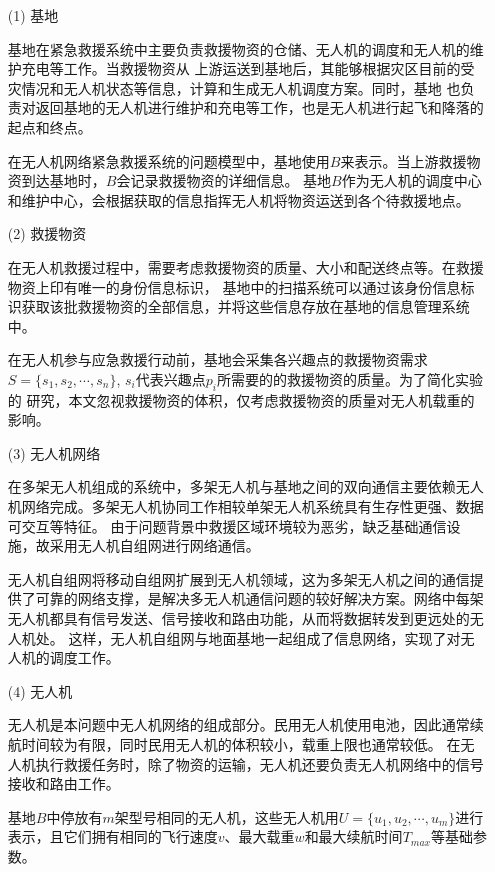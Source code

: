 \begin{itemize}
	\item [(1)]  
	基地


	\qquad 基地在紧急救援系统中主要负责救援物资的仓储、无人机的调度和无人机的维护充电等工作。当救援物资从
	上游运送到基地后，其能够根据灾区目前的受灾情况和无人机状态等信息，计算和生成无人机调度方案。同时，基地
	也负责对返回基地的无人机进行维护和充电等工作，也是无人机进行起飞和降落的起点和终点。


	\qquad 在无人机网络紧急救援系统的问题模型中，基地使用$B$来表示。当上游救援物资到达基地时，$B$会记录救援物资的详细信息。
	基地$B$作为无人机的调度中心和维护中心，会根据获取的信息指挥无人机将物资运送到各个待救援地点。

	\item[(2)]
	救援物资

	
	\qquad 在无人机救援过程中，需要考虑救援物资的质量、大小和配送终点等。在救援物资上印有唯一的身份信息标识，
	基地中的扫描系统可以通过该身份信息标识获取该批救援物资的全部信息，并将这些信息存放在基地的信息管理系统中。


	\qquad 在无人机参与应急救援行动前，基地会采集各兴趣点的救援物资需求$S=\lbrace s_1, s_2, \cdots ,s_n \rbrace$, $s_i$代表兴趣点$p_i$所需要的的救援物资的质量。为了简化实验的
	研究，本文忽视救援物资的体积，仅考虑救援物资的质量对无人机载重的影响。

	\item[(3)]
	无人机网络

	\qquad 在多架无人机组成的系统中，多架无人机与基地之间的双向通信主要依赖无人机网络完成。多架无人机协同工作相较单架无人机系统具有生存性更强、数据可交互等特征。
	由于问题背景中救援区域环境较为恶劣，缺乏基础通信设施，故采用无人机自组网进行网络通信。


	\qquad 无人机自组网将移动自组网扩展到无人机领域，这为多架无人机之间的通信提供了可靠的网络支撑，是解决多无人机通信问题的较好解决方案。网络中每架无人机都具有信号发送、信号接收和路由功能，从而将数据转发到更远处的无人机处。
	这样，无人机自组网与地面基地一起组成了信息网络，实现了对无人机的调度工作。

	\item[(4)]
	无人机

	
	\qquad 无人机是本问题中无人机网络的组成部分。民用无人机使用电池，因此通常续航时间较为有限，同时民用无人机的体积较小，载重上限也通常较低。
	在无人机执行救援任务时，除了物资的运输，无人机还要负责无人机网络中的信号接收和路由工作。

	\qquad 基地$B$中停放有$m$架型号相同的无人机，这些无人机用$U=\lbrace u_1, u_2, \cdots ,u_m \rbrace$进行表示，且它们拥有相同的飞行速度$v$、最大载重$w$和最大续航时间$T_{max}$等基础参数。


\end{itemize}
